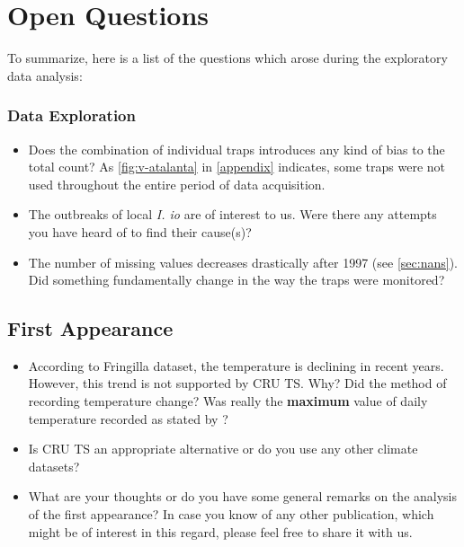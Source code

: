 \section{Open Questions}\label{sec:questions}

To summarize, here is a list of the questions which arose during the exploratory data analysis:

\subsubsection*{Data Exploration}
\begin{itemize}
	\item Does the combination of individual traps introduces any kind of bias to the total count? As \cref{fig:v-atalanta} in \cref{appendix} indicates, some traps were not used throughout the entire period of data acquisition.
	\item The outbreaks of local \textit{I. io} are of interest to us. Were there any attempts you have heard of to find their cause(s)?
	\item The number of missing values decreases drastically after 1997 (see \cref{sec:nans}). Did something fundamentally change in the way the traps were monitored?
\end{itemize}

\subsection*{First Appearance}
\begin{itemize}
	\item According to Fringilla dataset, the temperature is declining in recent years. However, this trend is not supported by CRU TS. Why? Did the method of recording temperature change? 
	Was really the \textbf{maximum} value of daily temperature recorded as stated by \textcite{shapoval2012}?
	\item Is CRU TS an appropriate alternative or do you use any other climate datasets?
	\item What are your thoughts or do you have some general remarks on the analysis of the first appearance? In case you know of any other publication, which might be of interest in this regard, please feel free to share it with us.
\end{itemize}